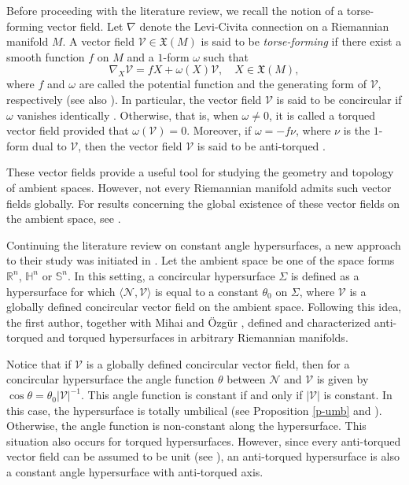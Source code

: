 \documentclass[12pt,reqno]{amsart}
\def\r{\mathbb R}
\def\s{\mathbb S}
\def\h{\mathbb H}
\def\v{\mathcal V}
\def\n{\mathcal N}
\def\x{\mathfrak X}
\theoremstyle{definition}
\begin{document}
Before proceeding with the literature review, we recall the notion of a torse-forming vector field. Let $\nabla$ denote the Levi-Civita connection on a Riemannian manifold $M$. A vector field $\v\in \x(M)$ is said to be {\it torse-forming} \cite{ya0} if there exist a smooth function $f$ on $M$ and a $1$-form $\omega$ such that
\begin{equation}\label{int-tor}
\nabla_X\v=fX+\omega(X)\v, \quad X\in \mathfrak{X}(M),
\end{equation}
where $f$ and $\omega$ are called the potential function and the generating form of $\v$, respectively (see also \cite{bo1,mih0}).  In particular, the vector field $\v$ is said to be concircular if $\omega$ vanishes identically \cite{ya1}. Otherwise, that is, when $\omega\neq 0$, it is called a torqued vector field provided that $\omega(\v)=0$. Moreover, if $\omega=-f\nu$, where $\nu$ is the $1$-form dual to $\v$, then the vector field $\v$ is said to be anti-torqued \cite{cs,dan,na}.

These vector fields provide a useful tool for studying the geometry and topology of ambient spaces. However, not every Riemannian manifold admits such vector fields globally. For results concerning the global existence of these vector fields on the ambient space, see \cite{amc,crs00,c01,dan,dta}. 

Continuing the literature review on constant angle hypersurfaces, a new approach to their study was initiated in \cite{loy4,loy5}. Let the ambient space be one of the space forms $\r^n$, $\h^n$ or $\s^n$. In this setting, a concircular hypersurface $\Sigma$ is defined as a hypersurface for which $\langle \n,\v\rangle$ is equal to a constant $\theta_0$ on $\Sigma$, where $\v$ is a globally defined concircular vector field on the ambient space. Following this idea, the first author, together with Mihai and Özgür \cite{amc2}, defined and characterized anti-torqued and torqued hypersurfaces in arbitrary Riemannian manifolds.

Notice that if $\v$ is a globally defined concircular vector field, then for a concircular hypersurface the angle function $\theta$ between $\n$ and $\v$ is given by $\cos\theta=\theta_0|\v|^{-1}$. This angle function is constant if and only if $|\v|$ is constant. In this case, the hypersurface is totally umbilical (see Proposition \ref{p-umb} and \cite[Proposition 4]{loy5}). Otherwise, the angle function is non-constant along the hypersurface. This situation also occurs for torqued hypersurfaces. However, since every anti-torqued vector field can be assumed to be unit (see \cite{dan}), an anti-torqued hypersurface is also a constant angle hypersurface with anti-torqued axis.
\end{document}
